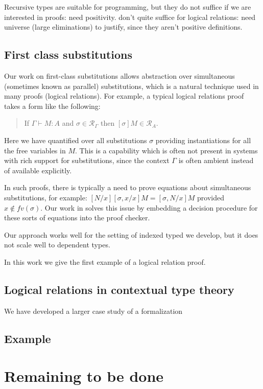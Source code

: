 \documentclass{article}
\begin{document}
Recursive types are suitable for programming, but they do not suffice
if we are interested in proofs: need positivity. don't quite suffice
for logical relations: need universe (large eliminations) to justify,
since they aren't positive definitions.
\subsection{First class substitutions}\label{sec:lfmtp13}
Our work on first-class substitutions \citep{Cave13} allows
abstraction over simultaneous (sometimes known as parallel)
substitutions, which is a natural technique used in many proofs
(logical relations). For example, a typical logical relations proof
takes a form like the following:

\begin{quote}
If $\Gamma \vdash M : A$ and $\sigma \in \mathcal{R}_\Gamma$ then
$[\sigma]M \in \mathcal{R}_A$.
\end{quote}

Here we have quantified over all substitutions $\sigma$ providing
instantiations for all the free variables in $M$. This is a capability
which is often not present in systems with rich support for
substitutions, since the context $\Gamma$ is often ambient instead of
available explicitly. 

In such proofs, there is typically a need to
prove equations about simultaneous substitutions, for example:
$[N/x][\sigma,x/x]M = [\sigma,N/x]M$ provided $x \not\in
fv(\sigma)$. Our work in \citep{Cave13} solves this issue by embedding
a decision procedure for these sorts of equations into the proof checker.

Our approach works well for the setting of indexed typed we develop,
but it does not scale well to dependent types.

In this work we give the first example of a logical relation proof.

\subsection{Logical relations in contextual type theory}
We have developed a larger case study of a formalization\citep{Cave14}
\subsection{Example}
\section{Remaining to be done}
\end{document}
